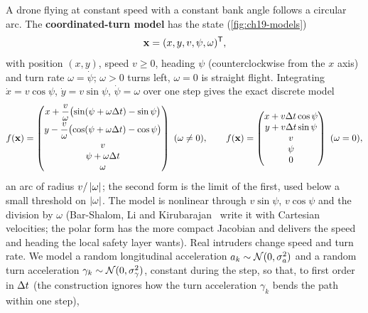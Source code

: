 A drone flying at constant speed with a constant bank angle follows a
circular arc. The \textbf{coordinated-turn model}
 has the state
(\cref{fig:ch19-models})
\begin{equation}
  \mathbf{x} = (x, y, v, \psi, \omega)^{\mathsf{T}},
  \label{eq:ch19-ct-state}
\end{equation}
with position $(x, y)$, speed $v \ge 0$, heading $\psi$ (counterclockwise
from the $x$ axis) and turn rate $\omega = \dot{\psi}$; $\omega > 0$ turns
left, $\omega = 0$ is straight flight. Integrating $\dot{x} = v\cos\psi$,
$\dot{y} = v\sin\psi$, $\dot{\psi} = \omega$ over one step gives the exact
discrete model
\begin{equation}
  f(\mathbf{x}) =
  \begin{pmatrix}
    x + \dfrac{v}{\omega}\bigl(\sin(\psi + \omega\Delta t) - \sin\psi\bigr)\\[1.2ex]
    y - \dfrac{v}{\omega}\bigl(\cos(\psi + \omega\Delta t) - \cos\psi\bigr)\\[1.2ex]
    v\\
    \psi + \omega\Delta t\\
    \omega
  \end{pmatrix}
  \ (\omega \ne 0), \qquad
  f(\mathbf{x}) =
  \begin{pmatrix}
    x + v\Delta t\cos\psi\\
    y + v\Delta t\sin\psi\\
    v\\
    \psi\\
    0
  \end{pmatrix}
  \ (\omega = 0),
  \label{eq:ch19-ct}
\end{equation}
an arc of radius $v/\left\lvert \omega \right\rvert$; the second form is the limit of the first,
used below a small threshold on $\left\lvert \omega \right\rvert$. The model is nonlinear
through $v\sin\psi$, $v\cos\psi$ and the division by $\omega$ (Bar-Shalom,
Li and Kirubarajan~\cite{barshalom2001estimation} write it with Cartesian
velocities; the polar form has the more compact Jacobian and delivers the
speed and heading the local safety layer wants). Real intruders change speed
and turn rate. We model a random longitudinal acceleration $a_k \sim
\mathcal{N}(0, \sigma_a^2)$ and a random turn acceleration $\gamma_k \sim
\mathcal{N}(0, \sigma_\gamma^2)$, constant during the step, so that, to first
order in $\Delta t$ (the construction ignores how the turn acceleration
$\gamma_k$ bends the path within one step),
